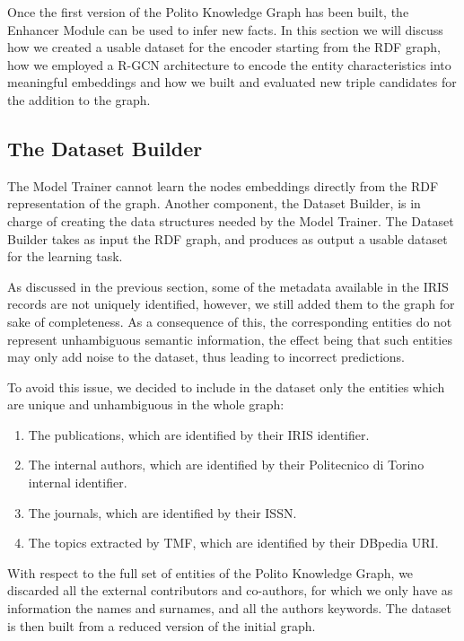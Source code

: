 \documentclass[%
    corpo=13.5pt,
    twoside,
    oldstyle,
    tipotesi=magistrale,
    greek,
    evenboxes
]{toptesi}
\begin{document}
Once the first version of the Polito Knowledge Graph has been built, the
Enhancer Module can be used to infer new facts. In this section we will discuss
how we created a usable dataset for the encoder starting from the RDF
graph, how we employed a R-GCN architecture to encode the entity characteristics
into meaningful embeddings and how we built and evaluated new triple candidates
for the addition to the graph.


\subsection{The Dataset Builder}

The Model Trainer cannot learn the nodes embeddings directly from the RDF
representation of the graph. Another component, the Dataset Builder, is in
charge of creating the data structures needed by the Model
Trainer.
The Dataset Builder takes as input the RDF graph, and produces as output a
usable dataset for the learning task.

As discussed in the previous section, some of the metadata available
in the IRIS records are not uniquely identified, however, we still added them
to the graph for sake of completeness.
As a consequence of this, the corresponding entities do not represent
unhambiguous semantic information, the effect being that such entities may
only add noise to the dataset, thus leading to incorrect predictions.

To avoid this issue, we decided to include in the dataset only the entities
which are unique and unhambiguous in the whole graph:

\begin{enumerate}
    \item The publications, which are identified by their IRIS identifier.
    \item The internal authors, which are identified by their Politecnico di
        Torino internal identifier.
    \item The journals, which are identified by their ISSN.
    \item The topics extracted by TMF, which are identified by their DBpedia
        URI.
\end{enumerate}

With respect to the full set of entities of the Polito Knowledge Graph, we
discarded all the external contributors and co-authors, for which we only have
as information the names and surnames, and all the authors keywords.
The dataset is then built from a reduced version of the initial graph.
\end{document}
